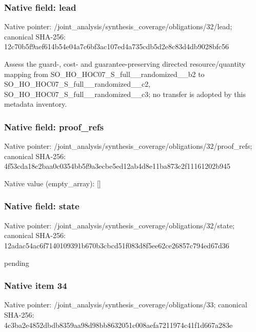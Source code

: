 \documentclass[10pt,a4paper]{article}
\begin{document}
\subsubsection{Native field: lead}
Native pointer: /joint\_\allowbreak{}analysis/synthesis\_\allowbreak{}coverage/obligations/32/lead; canonical SHA-256: 12c70b5f9aef614b54e04a7c6bf3ac107ed4a735cdb5d2e8c83d4db9028bfc56

\begingroup\raggedright\sloppy Assess the guard-,\allowbreak{} cost- and guarantee-preserving directed resource/\allowbreak{}quantity mapping from SO\_\allowbreak{}HO\_\allowbreak{}HOC07\_\allowbreak{}S\_\allowbreak{}full\_\allowbreak{}\_\allowbreak{}randomized\_\allowbreak{}\_\allowbreak{}b2 to SO\_\allowbreak{}HO\_\allowbreak{}HOC07\_\allowbreak{}S\_\allowbreak{}full\_\allowbreak{}\_\allowbreak{}randomized\_\allowbreak{}\_\allowbreak{}c2,\allowbreak{} SO\_\allowbreak{}HO\_\allowbreak{}HOC07\_\allowbreak{}S\_\allowbreak{}full\_\allowbreak{}\_\allowbreak{}randomized\_\allowbreak{}\_\allowbreak{}c3;\allowbreak{} no transfer is adopted by this metadata inventory.\par\endgroup

\subsubsection{Native field: proof\_\allowbreak{}refs}
Native pointer: /joint\_\allowbreak{}analysis/synthesis\_\allowbreak{}coverage/obligations/32/proof\_\allowbreak{}refs; canonical SHA-256: 4f53cda18c2baa0c0354bb5f9a3ecbe5ed12ab4d8e11ba873c2f11161202b945

Native value (empty\_\allowbreak{}array): []

\subsubsection{Native field: state}
Native pointer: /joint\_\allowbreak{}analysis/synthesis\_\allowbreak{}coverage/obligations/32/state; canonical SHA-256: 12adac54ac6f7140109391b670b3cbcd51f083d8f5ee62ce26857c794ed67d36

\begingroup\raggedright\sloppy pending\par\endgroup

\subsubsection{Native item 34}
Native pointer: /joint\_\allowbreak{}analysis/synthesis\_\allowbreak{}coverage/obligations/33; canonical SHA-256: 4c3ba2e4852dbdb8359aa98d98bb8632051c008aefa7211974c41f1d667a283e
\end{document}
